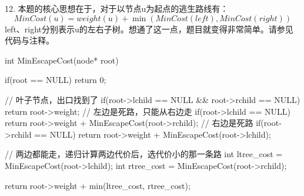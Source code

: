     12. 本题的核心思想在于，对于以节点u为起点的逃生路线有：
    \[
        MinCost(u)=weight(u)+\min(MinCost(left),MinCost(right))
    \]
    left、right分别表示u的左右子树。想通了这一点，题目就变得非常简单。请参见代码与注释。
    \begin{cppcode}
        int MinEscapeCost(node* root) {
            if(root == NULL) return 0;

            // 叶子节点，出口找到了
            if(root->lchild == NULL && root->rchild == NULL) {
                return root->weight;
            }
            // 左边是死路，只能从右边走
            if(root->lchild == NULL) {
                return root->weight + MinEscapeCost(root->rchild);
            }
            // 右边是死路
            if(root->rchild == NULL) {
                return root->weight + MinEscapeCost(root->lchild);
            }

            // 两边都能走，递归计算两边代价后，选代价小的那一条路
            int ltree_cost = MinEscapeCost(root->lchild);
            int rtree_cost = MinEscapeCost(root->rchild);

            return root->weight + min(ltree_cost, rtree_cost);
        }
    \end{cppcode}
    \vspace{\baselineskip}

